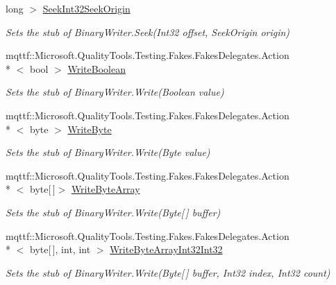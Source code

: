 \begin{DoxyCompactItemize}
long $>$ \hyperlink{class_system_1_1_i_o_1_1_fakes_1_1_stub_binary_writer_a4d79180fd237a80eea5620f2fd39cab8}{Seek\-Int32\-Seek\-Origin}
\begin{DoxyCompactList}\small\item\em Sets the stub of Binary\-Writer.\-Seek(\-Int32 offset, Seek\-Origin origin)\end{DoxyCompactList}\item 
mqttf\-::\-Microsoft.\-Quality\-Tools.\-Testing.\-Fakes.\-Fakes\-Delegates.\-Action\\*
$<$ bool $>$ \hyperlink{class_system_1_1_i_o_1_1_fakes_1_1_stub_binary_writer_ad384a3220b31d72508e793be024f76c2}{Write\-Boolean}
\begin{DoxyCompactList}\small\item\em Sets the stub of Binary\-Writer.\-Write(\-Boolean value)\end{DoxyCompactList}\item 
mqttf\-::\-Microsoft.\-Quality\-Tools.\-Testing.\-Fakes.\-Fakes\-Delegates.\-Action\\*
$<$ byte $>$ \hyperlink{class_system_1_1_i_o_1_1_fakes_1_1_stub_binary_writer_a3cd780429cede4287135d4020b7e221f}{Write\-Byte}
\begin{DoxyCompactList}\small\item\em Sets the stub of Binary\-Writer.\-Write(\-Byte value)\end{DoxyCompactList}\item 
mqttf\-::\-Microsoft.\-Quality\-Tools.\-Testing.\-Fakes.\-Fakes\-Delegates.\-Action\\*
$<$ byte\mbox{[}$\,$\mbox{]}$>$ \hyperlink{class_system_1_1_i_o_1_1_fakes_1_1_stub_binary_writer_a9569684b1570c5476afa76fafe81e814}{Write\-Byte\-Array}
\begin{DoxyCompactList}\small\item\em Sets the stub of Binary\-Writer.\-Write(\-Byte\mbox{[}$\,$\mbox{]} buffer)\end{DoxyCompactList}\item 
mqttf\-::\-Microsoft.\-Quality\-Tools.\-Testing.\-Fakes.\-Fakes\-Delegates.\-Action\\*
$<$ byte\mbox{[}$\,$\mbox{]}, int, int $>$ \hyperlink{class_system_1_1_i_o_1_1_fakes_1_1_stub_binary_writer_abaef3605910c758447fb80a0236db890}{Write\-Byte\-Array\-Int32\-Int32}
\begin{DoxyCompactList}\small\item\em Sets the stub of Binary\-Writer.\-Write(\-Byte\mbox{[}$\,$\mbox{]} buffer, Int32 index, Int32 count)\end{DoxyCompactList}\item 

\end{DoxyCompactItemize}
